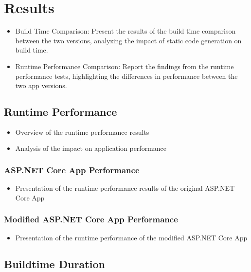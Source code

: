 \chapter{Results}

\begin{itemize}
    \item Build Time Comparison: Present the results of the build time comparison between the two versions, analyzing the impact of static code generation on build time.
    \item Runtime Performance Comparison: Report the findings from the runtime performance tests, highlighting the differences in performance between the two app versions.
\end{itemize}

\section{Runtime Performance}

\begin{itemize}
    \item Overview of the runtime performance results
    \item Analysis of the impact on application performance
\end{itemize}

\subsection{ASP.NET Core App Performance}

\begin{itemize}
    \item Presentation of the runtime performance results of the original ASP.NET Core App
\end{itemize}

\subsection{Modified ASP.NET Core App Performance}

\begin{itemize}
    \item Presentation of the runtime performance of the modified ASP.NET Core App
\end{itemize}

\section{Buildtime Duration}

